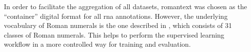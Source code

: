 
In order to facilitate the aggregation of all datasets,
\gls{romantext} was chosen as the ``container'' digital
format for all \gls{rna} annotations. However, the
underlying vocabulary of Roman numerals is the one described
in , which consists of
31 classes of Roman numerals. This helps to perform the
supervised learning workflow in a more controlled way for
training and evaluation.



